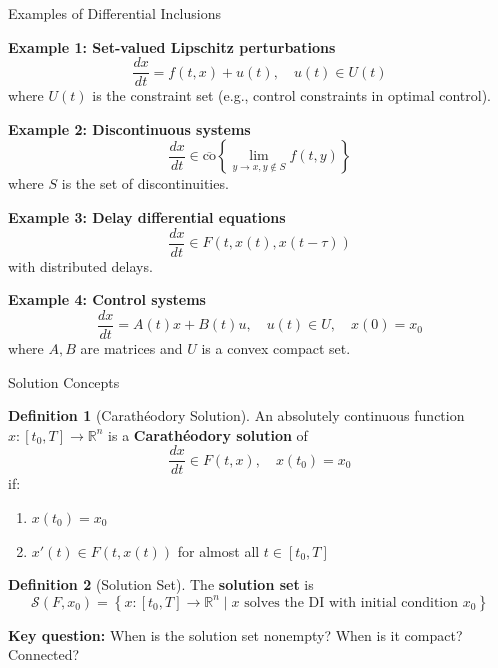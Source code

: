 \documentclass[aspectratio=169,10pt]{beamer}
\theoremstyle{definition}
\newtheorem{defn}{Definition}[section]
\begin{document}
\begin{frame}{Examples of Differential Inclusions}

\textbf{Example 1: Set-valued Lipschitz perturbations}
\[
\frac{dx}{dt} = f(t, x) + u(t), \quad u(t) \in U(t)
\]
where $U(t)$ is the constraint set (e.g., control constraints in optimal control).

\vspace{0.3cm}

\textbf{Example 2: Discontinuous systems}
\[
\frac{dx}{dt} \in \overline{\text{co}} \left\{ \lim_{y \to x, y \notin S} f(t, y) \right\}
\]
where $S$ is the set of discontinuities.

\vspace{0.3cm}

\textbf{Example 3: Delay differential equations}
\[
\frac{dx}{dt} \in F(t, x(t), x(t - \tau))
\]
with distributed delays.

\vspace{0.3cm}

\textbf{Example 4: Control systems}
\[
\frac{dx}{dt} = A(t)x + B(t)u, \quad u(t) \in U, \quad x(0) = x_0
\]
where $A, B$ are matrices and $U$ is a convex compact set.

\end{frame}

\begin{frame}{Solution Concepts}

\begin{defn}[Carathéodory Solution]
An absolutely continuous function $x: [t_0, T] \to \mathbb{R}^n$ is a \textbf{Carathéodory solution} of
\[
\frac{dx}{dt} \in F(t, x), \quad x(t_0) = x_0
\]
if:
\begin{enumerate}
    \item $x(t_0) = x_0$
    \item $x'(t) \in F(t, x(t))$ for almost all $t \in [t_0, T]$
\end{enumerate}
\end{defn}

\vspace{0.3cm}

\begin{defn}[Solution Set]
The \textbf{solution set} is
\[
\mathcal{S}(F, x_0) = \left\{ x: [t_0, T] \to \mathbb{R}^n \mid x \text{ solves the DI with initial condition } x_0 \right\}
\]
\end{defn}

\vspace{0.3cm}

\textbf{Key question:} When is the solution set nonempty? When is it compact? Connected?

\end{frame}
\end{document}
